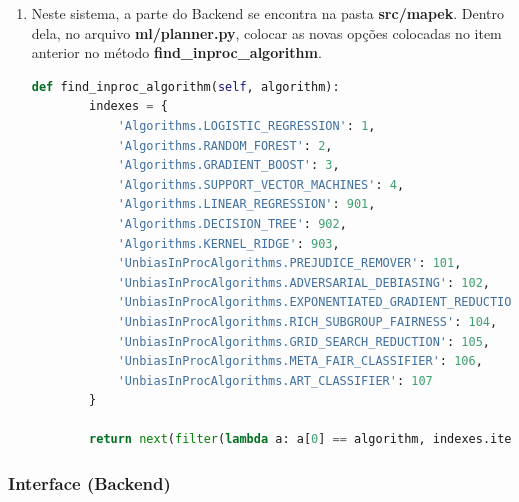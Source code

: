 \documentclass[Portugues,Final]{ic-tese-v3}
\begin{document}
\begin{enumerate}
\item Neste sistema, a parte do Backend se encontra na pasta \textbf{src/mapek}. Dentro dela, no arquivo \textbf{ml/planner.py}, colocar as novas opções colocadas no item anterior no método \textbf{find\_inproc\_algorithm}.

\begin{lstlisting}[language=Python, label=cod:findInprocAlgorithm]
    def find_inproc_algorithm(self, algorithm):
        indexes = {
            'Algorithms.LOGISTIC_REGRESSION': 1,
            'Algorithms.RANDOM_FOREST': 2,
            'Algorithms.GRADIENT_BOOST': 3,
            'Algorithms.SUPPORT_VECTOR_MACHINES': 4,
            'Algorithms.LINEAR_REGRESSION': 901,
            'Algorithms.DECISION_TREE': 902,
            'Algorithms.KERNEL_RIDGE': 903,
            'UnbiasInProcAlgorithms.PREJUDICE_REMOVER': 101,
            'UnbiasInProcAlgorithms.ADVERSARIAL_DEBIASING': 102,
            'UnbiasInProcAlgorithms.EXPONENTIATED_GRADIENT_REDUCTION': 103,
            'UnbiasInProcAlgorithms.RICH_SUBGROUP_FAIRNESS': 104,
            'UnbiasInProcAlgorithms.GRID_SEARCH_REDUCTION': 105,
            'UnbiasInProcAlgorithms.META_FAIR_CLASSIFIER': 106,
            'UnbiasInProcAlgorithms.ART_CLASSIFIER': 107
        }

        return next(filter(lambda a: a[0] == algorithm, indexes.items()))[1]
\end{lstlisting}
\end{enumerate}

\subsubsection{Interface (Backend)}
\end{document}
